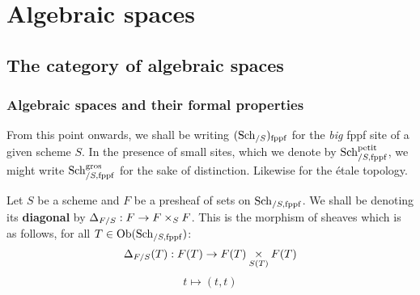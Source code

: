 \section{Algebraic spaces}
    \subsection{The category of algebraic spaces}
        \subsubsection{Algebraic spaces and their formal properties}
            \begin{convention} \label{conv: big_sites_of_schemes}
                From this point onwards, we shall be writing $(\mathrm{Sch}_{/S})_{\mathrm{fppf}}$ for the \textit{big} fppf site of a given scheme $S$. In the presence of small sites, which we denote by $\mathrm{Sch}_{/S, \mathrm{fppf}}^{\mathrm{petit}}$, we might write $\mathrm{Sch}_{/S, \mathrm{fppf}}^{\mathrm{gros}}$ for the sake of distinction. Likewise for the \'etale topology.
            \end{convention}
            \begin{convention}[Diagonals] \label{conv: algebraic_spaces_diagonals}
                Let $S$ be a scheme and $F$ be a presheaf of sets on $\mathrm{Sch}_{/S, \mathrm{fppf}}$. We shall be denoting its \textbf{diagonal} by $\Delta_{F/S}: F \to F \x_S F$. This is the morphism of sheaves which is as follows, for all $T \in \mathrm{Ob}(\mathrm{Sch}_{/S, \mathrm{fppf}})$:
                    $$\Delta_{F/S}(T): F(T) \to F(T) \x_{S(T)} F(T)$$
                    $$t \mapsto (t, t)$$
            \end{convention}
            
